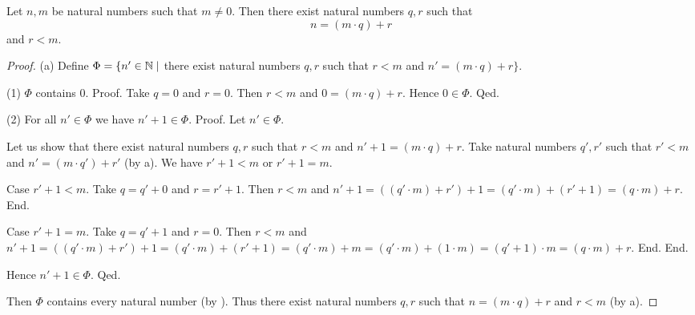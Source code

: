 \documentclass{article}
\begin{document}
  \begin{forthel}
    \begin{theorem}\label{euclid_existence}
      Let $n, m$ be natural numbers such that $m \neq 0$.
      Then there exist natural numbers $q, r$ such that
      \[n = (m \cdot q) + r\]
      and $r < m$.
    \end{theorem}
    \begin{proof}
      (a) Define $\Phi = \{ n' \in \mathbb{N} \mid$ there exist natural numbers $q, r$ such that $r < m$ and $n' = (m \cdot q) + r \}$.

      (1) $\Phi$ contains $0$.
      Proof.
        Take $q = 0$ and $r = 0$.
        Then $r < m$ and $0 = (m \cdot q) + r$.
        Hence $0 \in \Phi$.
      Qed.

      (2) For all $n' \in \Phi$ we have $n' + 1 \in \Phi$.
      Proof.
        Let $n' \in \Phi$.

        Let us show that there exist natural numbers $q, r$ such that $r < m$ and $n' + 1 = (m \cdot q) + r$.
          Take natural numbers $q', r'$ such that $r' < m$ and $n' = (m \cdot q') + r'$ (by a).
          We have $r' + 1 < m$ or $r' + 1 = m$.

          Case $r' + 1 < m$.
            Take $q = q' + 0$ and $r = r' + 1$. %
            Then $r < m$ and $n' + 1
              = ((q' \cdot m) + r') + 1
              = (q' \cdot m) + (r' + 1)
              = (q \cdot m) + r$.
          End.

          Case $r' + 1 = m$.
            Take  $q = q' + 1$ and $r = 0$.
            Then $r < m$ and
            $n' + 1
              = ((q' \cdot m) + r') + 1
              = (q' \cdot m) + (r' + 1)
              = (q' \cdot m) + m
              = (q' \cdot m) + (1 \cdot m)
              = (q' + 1) \cdot m
              = (q \cdot m) + r$.
          End.
        End.

        Hence $n' + 1 \in \Phi$.
      Qed.

      Then $\Phi$ contains every natural number (by ).
      Thus there exist natural numbers $q, r$ such that $n = (m \cdot q) + r$ and $r < m$ (by a).
    \end{proof}
  \end{forthel}
\end{document}
